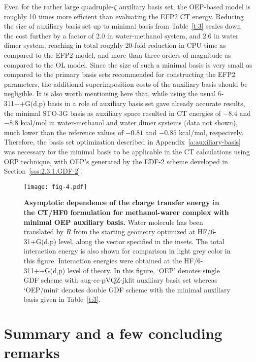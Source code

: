\documentclass[aip,jcp,amsmath,amssymb,reprint,floatfix]{revtex4-1}
\begin{document}
Even for the rather large quadruple\hyp{}$\zeta$ auxiliary basis set,
the OEP\hyp{}based model is roughly 10 times more efficient than evaluating the EFP2 CT energy.
Reducing the size of auxiliary basis set up to minimal basis from Table~\ref{t:3}
scales down the cost further by a factor of $2.0$ in water\hyp{}methanol system,
and $2.6$ in water dimer system, reaching in total roughly 20\hyp{}fold
reduction in CPU time as compared to the EFP2 model, and more than three orders of magnitude
as compared to the OL model. Since the size of such a minimal basis
is very small as compared to the primary basis sets recommended for constructing
the EFP2 parameters, the additional superimposition costs of the auxiliary basis
should be negligible. 
It is also worth mentioning here that, while using the usual 6-311++G(d,p) basis
in a role of auxiliary basis set 
gave already accurate results, the minimal STO-3G basis as auxiliary space resulted
in CT energies of $-8.4$ and $-8.8$ kcal/mol in water\hyp{}methanol and water dimer systems (data not shown),
much lower than the reference values of $-0.81$ and $-0.85$ kcal/mol, respecively. 
Therefore, the basis set optimization
described in Appendix~\ref{a:auxiliary-basis} was necessary for the minimal basis to be applicable
in the CT calculations using OEP technique, with OEP's generated by the EDF-2 scheme
developed in Section~\ref{sss:2.3.1.GDF-2}. 
%
%
\begin{figure}[t]
\texttt{[image: fig-4.pdf]}
\caption{\label{f:fig-4} {\bf Asymptotic dependence of the charge transfer energy
in the CT/HF0 formulation for methanol-warer complex with minimal OEP auxiliary basis.} 
Water molecule has been translated by $R$ from the starting geometry
optimized at HF/6-31+G(d,p) level,
along the vector specified in the insets.
The total interaction energy
is also shown for comparison in light grey color in this figure.
Interaction energies were obtained at the HF/6-311++G(d,p) level of theory.
In this figure, `OEP' denotes single GDF scheme with aug-cc-pVQZ-jkfit auxiliary basis set
whereas `OEP/mini` denotes double GDF scheme with the minimal auxiliary basis
given in Table~\ref{t:3}.
} 
\end{figure}
%



\section{\label{s:6.conclusions}Summary and a few concluding remarks}
\end{document}
